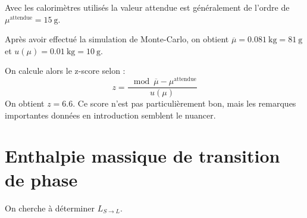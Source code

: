 \documentclass[a4paper,french,bookmarks]{article}
\begin{document}
Avec les calorimètres utilisés la valeur attendue est généralement de l'ordre de $\mu^\text{attendue} = \SI{15}{\g}$.

\noafter
%
%
\nobefore\yesafter
%
\begin{expcom} \text{}
    \begin{enumerate}
        \itt Après avoir effectué la simulation de Monte-Carlo, on obtient $\overline{\mu} = \SI{0.081}{\kg} = \SI{81}{\g}$ et $u\left(\mu\right) = \SI{0.01}{\kg} = \SI{10}{\g}$.
        
        \itt On calcule alors le z-score selon :
        \[ z = \dfrac{\mod{\overline{\mu} - \mu^\text{attendue}}}{u\left(\mu\right)}\]
        On obtient $z = 6.6$. Ce score n'est pas particulièrement bon, mais les remarques importantes données en introduction semblent le nuancer.
    \end{enumerate}
\end{expcom}
%
\yesbefore

\section{Enthalpie massique de transition de phase}

On cherche à déterminer $L_{S \to L}$.
\end{document}
